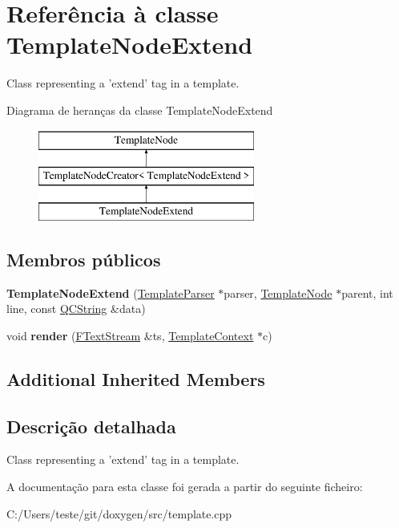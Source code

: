 \hypertarget{class_template_node_extend}{\section{Referência à classe Template\-Node\-Extend}
\label{class_template_node_extend}
}


Class representing a 'extend' tag in a template.  


Diagrama de heranças da classe Template\-Node\-Extend\begin{figure}[H]
\begin{center}
\leavevmode
\includegraphics[height=3.000000cm]{class_template_node_extend}
\end{center}
\end{figure}
\subsection*{Membros públicos}
\begin{DoxyCompactItemize}
\item 
\hypertarget{class_template_node_extend_abe043d6a81e80ef7cc0df638859dcb6d}{{\bfseries Template\-Node\-Extend} (\hyperlink{class_template_parser}{Template\-Parser} $\ast$parser, \hyperlink{class_template_node}{Template\-Node} $\ast$parent, int line, const \hyperlink{class_q_c_string}{Q\-C\-String} \&data)}\label{class_template_node_extend_abe043d6a81e80ef7cc0df638859dcb6d}

\item 
\hypertarget{class_template_node_extend_aaa6575d8c79eeaa49f849f1ca1d6b228}{void {\bfseries render} (\hyperlink{class_f_text_stream}{F\-Text\-Stream} \&ts, \hyperlink{class_template_context}{Template\-Context} $\ast$c)}\label{class_template_node_extend_aaa6575d8c79eeaa49f849f1ca1d6b228}

\end{DoxyCompactItemize}
\subsection*{Additional Inherited Members}


\subsection{Descrição detalhada}
Class representing a 'extend' tag in a template. 

A documentação para esta classe foi gerada a partir do seguinte ficheiro\-:\begin{DoxyCompactItemize}
\item 
C\-:/\-Users/teste/git/doxygen/src/template.\-cpp\end{DoxyCompactItemize}
